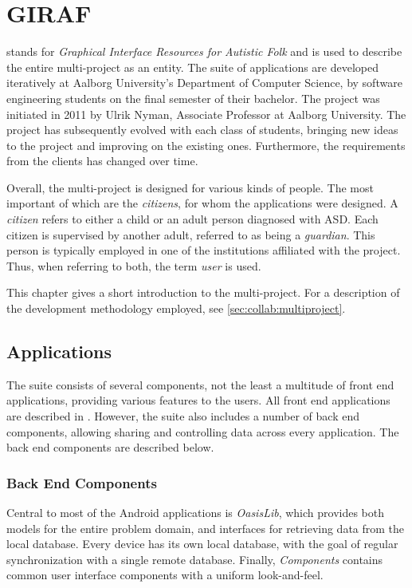 \chapter{GIRAF}\label{chap:giraf}
\giraf  stands for \textit{Graphical Interface Resources for Autistic Folk} and is used to describe the entire multi-project as an entity.
The suite of \giraf applications are developed iteratively at Aalborg University's Department of Computer Science, by software engineering students on the final semester of their bachelor.
The project was initiated in 2011 by Ulrik Nyman, Associate Professor at Aalborg University.
The project has subsequently evolved with each class of students, bringing new ideas to the project and improving on the existing ones.
Furthermore, the requirements from the clients has changed over time.

Overall, the multi-project is designed for various kinds of people.
The most important of which are the \textit{citizens}, for whom the applications were designed.
A \textit{citizen} refers to either a child or an adult person diagnosed with ASD.
Each citizen is supervised by another adult, referred to as being a \textit{guardian}.
This person is typically employed in one of the institutions affiliated with the \giraf project.
Thus, when referring to both, the term \textit{user} is used.

This chapter gives a short introduction to the \giraf multi-project.
For a description of the development methodology employed, see \cref{sec:collab:multiproject}.

\section{\giraf Applications}\label{sec:giraf:applications}
The \giraf suite consists of several components, not the least a multitude of front end applications, providing various features to the users. 
All front end applications are described in . 
However, the suite also includes a number of back end components, allowing sharing and controlling data across every application. 
The back end components are described below.


\subsection{Back End Components}
\label{sec:giraf:applications:backend}
Central to most of the Android applications is \textit{OasisLib}, which provides both models for the entire problem domain, and interfaces for retrieving data from the local database.
Every device has its own local database, with the goal of regular synchronization with a single remote database. 
Finally, \textit{\giraf Components} contains common user interface components with a uniform look-and-feel. 

